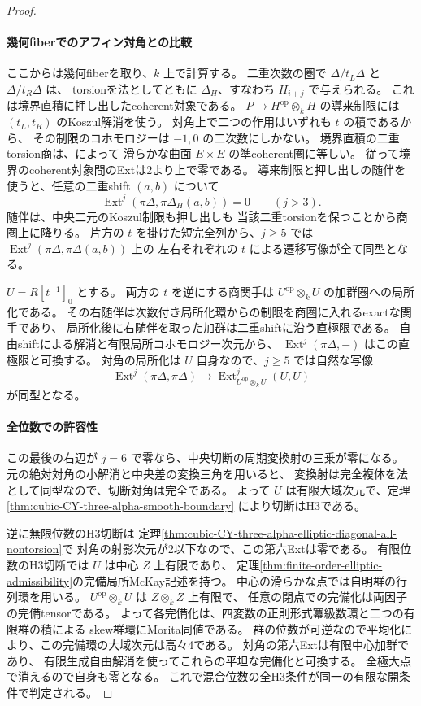 \begin{proof}
\paragraph{幾何fiberでのアフィン対角との比較}
ここからは幾何fiberを取り、$k$ 上で計算する。
二重次数の圏で $\Delta/t_L\Delta$ と $\Delta/t_R\Delta$ は、
torsionを法としてともに $\Delta_H$、すなわち $H_{i+j}$ で与えられる。
これは境界直積に押し出したcoherent対象である。
$P\to H^{\mathrm{op}}\otimes_k H$ の導来制限には
$(t_L,t_R)$ のKoszul解消を使う。
対角上で二つの作用はいずれも $t$ の積であるから、
その制限のコホモロジーは $-1,0$ の二次数にしかない。
境界直積の二重torsion商は、\cite[定理3.4]{ChanTwistedMulti}によって
滑らかな曲面 $E\times E$ の準coherent圏に等しい。
従って境界のcoherent対象間のExtは2より上で零である。
導来制限と押し出しの随伴を使うと、任意の二重shift $(a,b)$ について
\[
 \operatorname{Ext}^j(\pi\Delta,\pi\Delta_H(a,b))=0\qquad(j>3).
\]
随伴は、中央二元のKoszul制限も押し出しも
当該二重torsionを保つことから商圏上に降りる。
片方の $t$ を掛けた短完全列から、$j\ge5$ では
$\operatorname{Ext}^j(\pi\Delta,\pi\Delta(a,b))$ 上の
左右それぞれの $t$ による遷移写像が全て同型となる。

$U=R[t^{-1}]_0$ とする。
両方の $t$ を逆にする商関手は $U^{\mathrm{op}}\otimes_k U$ の加群圏への局所化である。
その右随伴は次数付き局所化環からの制限を商圏に入れるexactな関手であり、
局所化後に右随伴を取った加群は二重shiftに沿う直極限である。
自由shiftによる解消と有限局所コホモロジー次元から、
$\operatorname{Ext}^j(\pi\Delta,-)$ はこの直極限と可換する。
対角の局所化は $U$ 自身なので、$j\ge5$ では自然な写像
\[
 \operatorname{Ext}^j(\pi\Delta,\pi\Delta)
 \longrightarrow \operatorname{Ext}^j_{U^{\mathrm{op}}\otimes_k U}(U,U)
\]
が同型となる。

\paragraph{全位数での許容性}
この最後の右辺が $j=6$ で零なら、中央切断の周期変換射の三乗が零になる。
元の絶対対角の小解消と中央差の変換三角を用いると、
変換射は完全複体を法として同型なので、切断対角は完全である。
よって $U$ は有限大域次元で、定理\ref{thm:cubic-CY-three-alpha-smooth-boundary}
により切断はH3である。

逆に無限位数のH3切断は
定理\ref{thm:cubic-CY-three-alpha-elliptic-diagonal-all-nontorsion}で
対角の射影次元が2以下なので、この第六Extは零である。
有限位数のH3切断では $U$ は中心 $Z$ 上有限であり、
定理\ref{thm:finite-order-elliptic-admissibility}の完備局所McKay記述を持つ。
中心の滑らかな点では自明群の行列環を用いる。
$U^{\mathrm{op}}\otimes_k U$ は $Z\otimes_k Z$ 上有限で、
任意の閉点での完備化は両因子の完備tensorである。
よって各完備化は、四変数の正則形式冪級数環と二つの有限群の積による
skew群環にMorita同値である。
群の位数が可逆なので平均化により、この完備環の大域次元は高々4である。
対角の第六Extは有限中心加群であり、
有限生成自由解消を使ってこれらの平坦な完備化と可換する。
全極大点で消えるので自身も零となる。
これで混合位数の全H3条件が同一の有限な開条件で判定される。


\end{proof}
